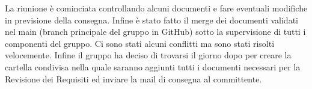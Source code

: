 La riunione è cominciata controllando alcuni documenti e fare eventuali modifiche in previsione della consegna. Infine \`{e} stato fatto il merge dei documenti validati nel main (branch principale del gruppo in GitHub) sotto la supervisione di tutti i componenti del gruppo. Ci sono stati alcuni conflitti ma sono stati risolti velocemente. Infine il gruppo ha deciso di trovarsi il giorno dopo per creare la cartella condivisa nella quale saranno aggiunti tutti i documenti necessari per la Revisione dei Requisiti ed inviare la mail di consegna al committente.
